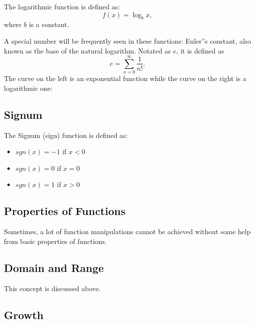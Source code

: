 The logarithmic function is defined as:
\[
f(x) = \log_b x,
\]
where $b$ is a constant.

A special number will be frequently seen in these functions: Euler''s constant, also known as the base of the natural logarithm. Notated as $e$, it is defined as
\[
e = \sum_{n=0}^{\infty} \frac{1}{n!}.
\]
The curve on the left is an exponential function while the curve on the right is a
logarithmic one:


\subsection{Signum}
\label{sss:sign-327b}

The Signum (sign) function is defined as:

\begin{itemize}
    \item \(sgn(x) = -1\) if \(x < 0\)
    \item \(sgn(x) = 0\) if \(x = 0\)
    \item \(sgn(x) = 1\) if \(x > 0\)
\end{itemize}

\subsection{Properties of Functions}
\label{sss:prop-3b03}

Sometimes, a lot of function manipulations cannot be achieved without some help from basic
properties of functions.

\subsection{Domain and Range}
\label{sss:doma-1606}

This concept is discussed above.

\subsection{Growth}
\label{sss:grow-5ff5}

